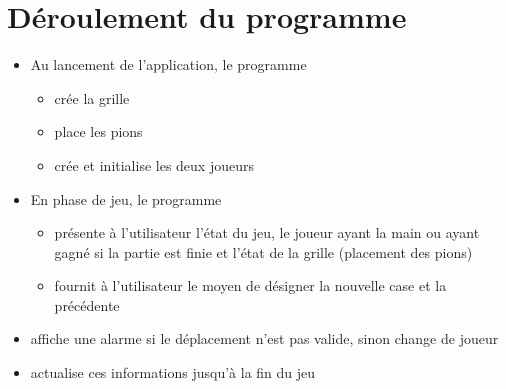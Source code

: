 \documentclass[12pt]{article}
\begin{document}
\section{Déroulement du programme}
 \begin{itemize}
 \item Au lancement de l'application, le programme
 \begin{itemize}
  \item[\textbullet] crée la grille
  \item[\textbullet] place les pions
  \item[\textbullet] crée et initialise les deux joueurs
 \end{itemize}
 \item En phase de jeu, le programme
 \begin{itemize}
  \item[\textbullet] présente à l'utilisateur l'état du jeu, le joueur ayant la main ou ayant gagné si la partie est finie et l'état de la grille (placement des pions)
  \item[\textbullet] fournit à l'utilisateur le moyen de désigner la nouvelle case et la précédente
  \end{itemize}
 
  \item affiche une alarme si le déplacement n'est pas valide, sinon change de joueur
  \item actualise ces informations jusqu'à la fin du jeu
 \end{itemize}
\end{document}
